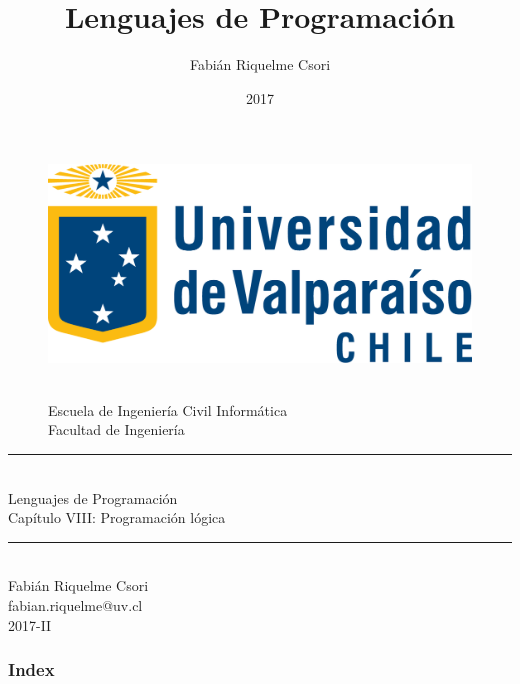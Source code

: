 \documentclass[handout]{beamer} %
\title{Lenguajes de Programación}                     %
\author{Fabián Riquelme Csori}                        %
\date{2017}                                           %
\institute{Universidad de Valparaíso}                 %
\newcommand{\HRule}{\rule{\linewidth}{0.2mm}\\[1ex]}
\begin{document}
%

\begin{frame}[plain]
  \begin{figure}[h]
    \begin{minipage}{0.3\textwidth}
    \includegraphics[width=.9\textwidth]{./image/logo-UV.png}
    \end{minipage}
    \begin{minipage}{0.65\textwidth}
     $~$\\[3.6ex]
     \footnotesize{Escuela de Ingeniería Civil Informática}\\
     \footnotesize{Facultad de Ingeniería}
    \end{minipage}
  \end{figure}
  \begin{center}
    \vspace{1ex}
    \HRule
    \Large{Lenguajes de Programación}\\{\small Capítulo VIII: Programación lógica}\\[-1ex]
    \HRule\vspace{1ex}
    \large{Fabián Riquelme Csori}\\[.5ex]\footnotesize{fabian.riquelme@uv.cl}\\[6ex] {\tiny 2017-II}\\[6ex]
  \end{center}
\end{frame}

\begin{frame}
 \frametitle{Index}
 \scriptsize 			%
 \tableofcontents		%
\end{frame}
\end{document}
